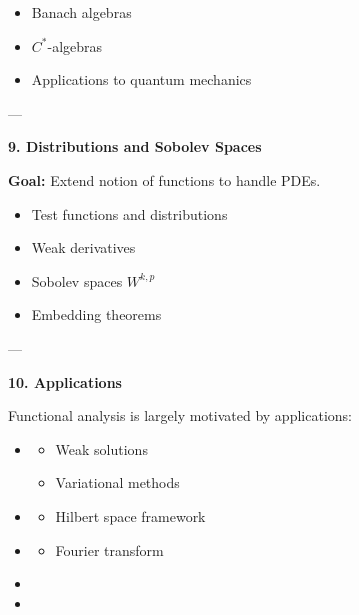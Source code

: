 \documentclass[12pt,a4paper]{report}
\begin{document}
\begin{description}
\begin{itemize}
    \item Banach algebras
    \item $ C^* $-algebras
    \item Applications to quantum mechanics
\end{itemize}

---

\item \textbf{9. Distributions and Sobolev Spaces}

\item \textbf{Goal:} Extend notion of functions to handle PDEs.

\begin{itemize}
    \item Test functions and distributions
    \item Weak derivatives
    \item Sobolev spaces $ W^{k,p} $
    \item Embedding theorems

\end{itemize}

---

\item \textbf{10. Applications}

Functional analysis is largely motivated by applications:

\begin{itemize}
    \item {}

	\begin{itemize}
        \item Weak solutions
        \item Variational methods
	\end{itemize}
    \item {}

	\begin{itemize}
        \item Hilbert space framework
	\end{itemize}
    \item {}

	\begin{itemize}
        \item Fourier transform
	\end{itemize}
    \item {}
    \item {}
\end{itemize}


\end{description}
\end{document}
